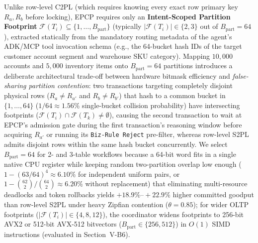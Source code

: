 \documentclass[conference,10pt]{IEEEtran}
\begin{document}
Unlike row-level C2PL (which requires knowing every exact row primary key $R_a, R_b$ before locking), EPCP requires only an \textbf{Intent-Scoped Partition Footprint} $\mathcal{F}(T_i) \subseteq \{1, \dots, B_{\text{part}}\}$ (typically $|\mathcal{F}(T_i)| \in \{2, 3\}$ out of $B_{\text{part}} = 64$), extracted statically from the mandatory routing metadata of the agent's ADK/MCP tool invocation schema (e.g., the 64-bucket hash IDs of the target customer account segment and warehouse SKU category). Mapping $10{,}000$ accounts and $5{,}000$ inventory items onto $B_{\text{part}} = 64$ partitions introduces a deliberate architectural trade-off between hardware bitmask efficiency and \textit{false-sharing partition contention}: two transactions targeting completely disjoint physical rows ($R_a \ne R_{a'}$ and $R_b \ne R_{b'}$) that hash to a common bucket in $\{1, \dots, 64\}$ ($1/64 \approx 1.56\%$ single-bucket collision probability) have intersecting footprints ($\mathcal{F}(T_i) \cap \mathcal{F}(T_k) \ne \emptyset$), causing the second transaction to wait at EPCP's admission gate during the first transaction's reasoning window before acquiring $R_{a'}$ or running its \texttt{Biz-Rule Reject} pre-filter, whereas row-level S2PL admits disjoint rows within the same hash bucket concurrently. We select $B_{\text{part}} = 64$ for 2- and 3-table workflows because a 64-bit word fits in a single native CPU register while keeping random two-partition overlap low enough ($1 - (63/64)^4 \approx 6.10\%$ for independent uniform pairs, or $1 - \binom{62}{2}/\binom{64}{2} \approx 6.20\%$ without replacement) that eliminating multi-resource deadlocks and token rollbacks yields $+18.9\%\text{--}+22.9\%$ higher committed goodput than row-level S2PL under heavy Zipfian contention ($\theta = 0.85$); for wider OLTP footprints ($|\mathcal{F}(T_i)| \in \{4, 8, 12\}$), the coordinator widens footprints to 256-bit AVX2 or 512-bit AVX-512 bitvectors ($B_{\text{part}} \in \{256, 512\}$) in $O(1)$ SIMD instructions (evaluated in Section~V-B6).
\end{document}
